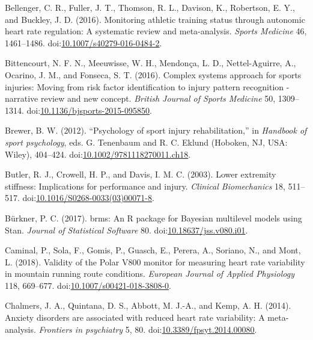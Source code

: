 \documentclass[
  english,
  man]{apa6}
\newlength{\cslhangindent}
\newenvironment{cslreferences}%
  {\setlength{\parindent}{0pt}%
  \everypar{\setlength{\hangindent}{\cslhangindent}}\ignorespaces}%
  {\par}
\begin{document}
\begin{cslreferences}
\leavevmode\hypertarget{ref-Bellenger2016}{}%
Bellenger, C. R., Fuller, J. T., Thomson, R. L., Davison, K., Robertson, E. Y., and Buckley, J. D. (2016). Monitoring athletic training status through autonomic heart rate regulation: A systematic review and meta-analysis. \emph{Sports Medicine} 46, 1461--1486. doi:\href{https://doi.org/10.1007/s40279-016-0484-2}{10.1007/s40279-016-0484-2}.

\leavevmode\hypertarget{ref-Bittencourt2016}{}%
Bittencourt, N. F. N., Meeuwisse, W. H., Mendonça, L. D., Nettel-Aguirre, A., Ocarino, J. M., and Fonseca, S. T. (2016). Complex systems approach for sports injuries: Moving from risk factor identification to injury pattern recognition - narrative review and new concept. \emph{British Journal of Sports Medicine} 50, 1309--1314. doi:\href{https://doi.org/10.1136/bjsports-2015-095850}{10.1136/bjsports-2015-095850}.

\leavevmode\hypertarget{ref-Brewer2012}{}%
Brewer, B. W. (2012). ``Psychology of sport injury rehabilitation,'' in \emph{Handbook of sport psychology}, eds. G. Tenenbaum and R. C. Eklund (Hoboken, NJ, USA: Wiley), 404--424. doi:\href{https://doi.org/10.1002/9781118270011.ch18}{10.1002/9781118270011.ch18}.

\leavevmode\hypertarget{ref-Butler2003}{}%
Butler, R. J., Crowell, H. P., and Davis, I. M. C. (2003). Lower extremity stiffness: Implications for performance and injury. \emph{Clinical Biomechanics} 18, 511--517. doi:\href{https://doi.org/10.1016/S0268-0033(03)00071-8}{10.1016/S0268-0033(03)00071-8}.

\leavevmode\hypertarget{ref-Burkner2017a}{}%
Bürkner, P. C. (2017). brms: An R package for Bayesian multilevel models using Stan. \emph{Journal of Statistical Software} 80. doi:\href{https://doi.org/10.18637/jss.v080.i01}{10.18637/jss.v080.i01}.

\leavevmode\hypertarget{ref-Caminal2018}{}%
Caminal, P., Sola, F., Gomis, P., Guasch, E., Perera, A., Soriano, N., and Mont, L. (2018). Validity of the Polar V800 monitor for measuring heart rate variability in mountain running route conditions. \emph{European Journal of Applied Physiology} 118, 669--677. doi:\href{https://doi.org/10.1007/s00421-018-3808-0}{10.1007/s00421-018-3808-0}.

\leavevmode\hypertarget{ref-Chalmers2014}{}%
Chalmers, J. A., Quintana, D. S., Abbott, M. J.-A., and Kemp, A. H. (2014). Anxiety disorders are associated with reduced heart rate variability: A meta-analysis. \emph{Frontiers in psychiatry} 5, 80. doi:\href{https://doi.org/10.3389/fpsyt.2014.00080}{10.3389/fpsyt.2014.00080}.


\end{cslreferences}
\end{document}
